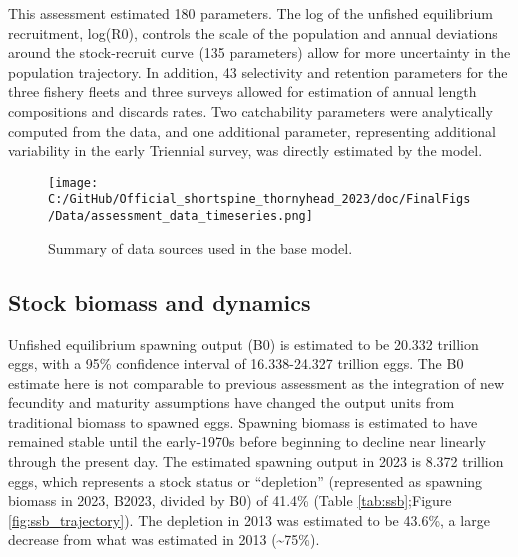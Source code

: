 \documentclass[11pt,
  english,
  letterpaper,
]{article}
\begin{document}
This assessment estimated 180 parameters. The log of the unfished equilibrium recruitment, log(R0), controls the scale of the population and annual deviations around the stock-recruit curve (135 parameters) allow for more uncertainty in the population trajectory. In addition, 43 selectivity and retention parameters for the three fishery fleets and three surveys allowed for estimation of annual length compositions and discards rates. Two catchability parameters were analytically computed from the data, and one additional parameter, representing additional variability in the early Triennial survey, was directly estimated by the model.

\begin{figure}
\centering
\texttt{[image: C:/GitHub/Official\_shortspine\_thornyhead\_2023/doc/FinalFigs/Data/assessment\_data\_timeseries.png]}
\caption{Summary of data sources used in the base model.\label{fig:assessment_data_timeseries}}
\end{figure}

\hypertarget{stock-biomass-and-dynamics}{%
\subsection*{Stock biomass and dynamics}\label{stock-biomass-and-dynamics}}

Unfished equilibrium spawning output (B0) is estimated to be 20.332 trillion eggs, with a 95\% confidence interval of 16.338-24.327 trillion eggs. The B0 estimate here is not comparable to previous assessment as the integration of new fecundity and maturity assumptions have changed the output units from traditional biomass to spawned eggs. Spawning biomass is estimated to have remained stable until the early-1970s before beginning to decline near linearly through the present day. The estimated spawning output in 2023 is 8.372 trillion eggs, which represents a stock status or ``depletion'' (represented as spawning biomass in 2023, B2023, divided by B0) of 41.4\% (Table \ref{tab:ssb};Figure \ref{fig:ssb_trajectory}). The depletion in 2013 was estimated to be 43.6\%, a large decrease from what was estimated in 2013 (\textasciitilde75\%).

\begingroup\fontsize{10}{12}\selectfont
\begingroup\fontsize{10}{12}\selectfont
\end{document}

